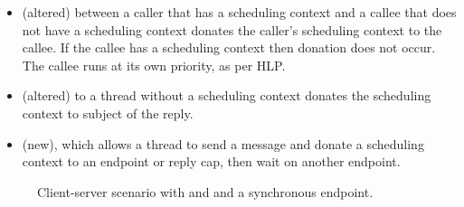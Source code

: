 \begin{itemize}
	\item \call (altered) between a caller that has a scheduling context and a callee that does not
        have a scheduling context donates the caller's scheduling context to the callee. If the callee has a scheduling context then donation does not occur. The callee runs at its own priority, as per \gls{HLP}.
	\item \replyrecv (altered) to a thread without a scheduling context donates the scheduling context to subject of the reply.
    \item \sendrecv (new), which allows a thread to send a message and donate a scheduling context to an endpoint or reply cap, then wait on another endpoint.
\end{itemize}
\begin{figure}
\centering
\caption{Client-server scenario with \call and \replyrecv and a synchronous endpoint.}
\label{fig:client-server-endpoint}
\end{figure}

